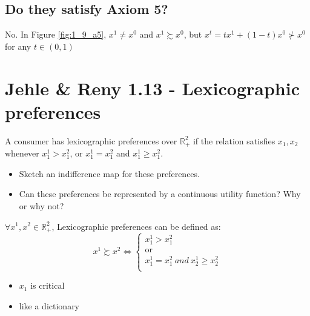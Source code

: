 \documentclass{article}
\newcommand{\R}{\mathbb{R}}
\begin{document}
\subsection{Do they satisfy Axiom 5?}

No. In Figure \ref{fig:1_9_a5}, $x^1 \ne x^0$ and $x^1 \succsim x^0$, but
$x^t=tx^1+(1-t)x^0 \nsucc x^0$ for any $t \in (0,1)$


{\centering
{}
\label{fig:1_9_a5}}


\section{Jehle \& Reny 1.13 - Lexicographic preferences}
A consumer has lexicographic preferences over $\R^2_+$ if the relation  satisfies $x_1, x_2$ whenever
$x_1^1 > x_1^2$, or $x_1^1 = x_1^2$ and $x_1^1 \ge x_1^2$.

\begin{itemize}
\item Sketch an indifference map for these preferences.
\item Can these preferences be represented by a continuous utility function? Why or why not?
\end{itemize}

\begin{mdframed}[backgroundcolor=blue!20,linecolor=white]
$\forall x^1,x^2 \in \R^2_+$, Lexicographic preferences can be defined as:
\begin{equation}
x^1 \succsim x^2 \Leftrightarrow
    \begin{cases}
      \text{$x^1_1 > x^2_1$}\\
      \text{or}\\
      \text{$x^1_1 = x^2_1 \ and \ x^1_2 \ge x^2_2$}\\
    \end{cases}
    \label{eq:laxi}       
\end{equation}
\begin{itemize}
\item $x_1$ is critical
\item like a dictionary
\end{itemize}
\end{mdframed}
\end{document}
